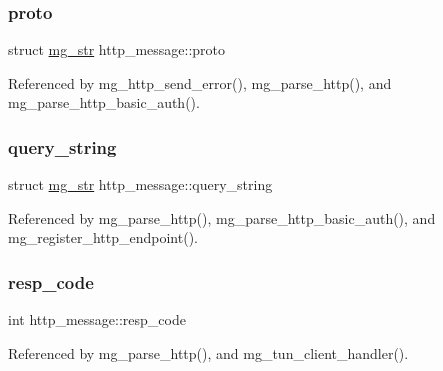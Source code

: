 \mbox{\label{structhttp__message_aafd1525884e7c83d781d86c063ec1f4f_aafd1525884e7c83d781d86c063ec1f4f}} 
\subsubsection{\texorpdfstring{proto}{proto}}
{\footnotesize\ttfamily struct \hyperlink{structmg__str}{mg\+\_\+str} http\+\_\+message\+::proto}



Referenced by mg\+\_\+http\+\_\+send\+\_\+error(), mg\+\_\+parse\+\_\+http(), and mg\+\_\+parse\+\_\+http\+\_\+basic\+\_\+auth().

\mbox{\label{structhttp__message_a899c4cefcdda3ba4fbafcfb05a85bba5_a899c4cefcdda3ba4fbafcfb05a85bba5}} 
\subsubsection{\texorpdfstring{query\+\_\+string}{query\_string}}
{\footnotesize\ttfamily struct \hyperlink{structmg__str}{mg\+\_\+str} http\+\_\+message\+::query\+\_\+string}



Referenced by mg\+\_\+parse\+\_\+http(), mg\+\_\+parse\+\_\+http\+\_\+basic\+\_\+auth(), and mg\+\_\+register\+\_\+http\+\_\+endpoint().

\mbox{\label{structhttp__message_a1c4e12c873f1e4d9711d470e2e32fa65_a1c4e12c873f1e4d9711d470e2e32fa65}} 
\subsubsection{\texorpdfstring{resp\+\_\+code}{resp\_code}}
{\footnotesize\ttfamily int http\+\_\+message\+::resp\+\_\+code}



Referenced by mg\+\_\+parse\+\_\+http(), and mg\+\_\+tun\+\_\+client\+\_\+handler().

